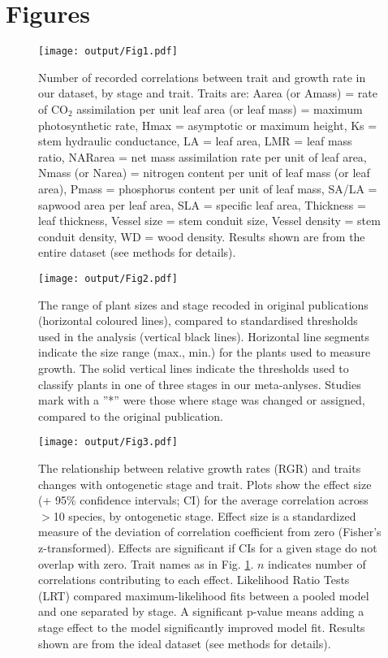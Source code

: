\documentclass[a4paper,11pt]{article}
\begin{document}
\clearpage
\section*{Figures}

\begin{figure}[h!]
\centering
\texttt{[image: output/Fig1.pdf]}
\caption{Number of recorded correlations between trait and growth rate in our dataset, by stage and trait. Traits are: Aarea (or Amass) = rate of CO$_{2}$ assimilation per unit leaf area (or leaf mass) = maximum photosynthetic rate, Hmax = asymptotic or maximum height,  Ks = stem hydraulic conductance, LA = leaf area, LMR = leaf mass ratio, NARarea = net mass assimilation rate per unit of leaf area, Nmass (or Narea) = nitrogen content per unit of leaf mass (or leaf area), Pmass = phosphorus content per unit of leaf mass, SA/LA = sapwood area per leaf area, SLA = specific leaf area, Thickness = leaf thickness, Vessel size = stem conduit size, Vessel density = stem conduit density, WD = wood density. Results shown are from the entire dataset (see methods for details).}
\label{fig:fig1}
\end{figure}


\begin{figure}[h!]
\centering
\texttt{[image: output/Fig2.pdf]}
\caption{The range of plant sizes and stage recoded in original publications (horizontal coloured lines), compared to standardised thresholds used in the analysis (vertical black lines). Horizontal line segments indicate the size range (max., min.) for the plants used to measure growth. The solid vertical lines indicate the thresholds used to classify plants in one of three stages in our meta-anlyses. Studies mark with a ''*'' were those where stage was changed or assigned, compared to the original publication. }
\label{fig:fig2}
\end{figure}



\begin{figure}[h!]
\centering
\texttt{[image: output/Fig3.pdf]}
\caption{The relationship between relative growth rates (RGR) and traits changes with ontogenetic stage and trait. Plots show the effect size (+ 95\% confidence intervals; CI) for the average correlation across $>$10 species, by ontogenetic stage. Effect size is a standardized measure of the deviation of correlation coefficient from zero (Fisher's z-transformed). Effects are significant if CIs for a given stage do not overlap with zero. Trait names as in Fig. \ref{fig:fig1}. $n$ indicates number of correlations contributing to each effect. Likelihood Ratio Tests (LRT) compared maximum-likelihood fits between a pooled model and one separated by stage. A significant p-value means adding a stage effect to the model significantly improved model fit. Results shown are from the ideal dataset (see methods for details).}
\label{fig:fig3}
\end{figure}
\end{document}
